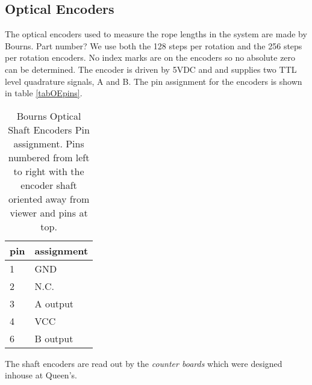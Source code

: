 \subsection{Optical Encoders}
The optical encoders used to measure the rope lengths in the system
are made by Bourns.  Part number?  We use both the 128 steps per
rotation and the 256 steps per rotation encoders.  No index marks are
on the encoders so no absolute zero can be determined.  The encoder
is driven by 5VDC and and supplies two TTL level quadrature signals,
A and B.  The pin assignment for the encoders is shown in 
table \ref{tabOEpins}.
\begin{table}[htb]
\begin{center}
\begin{tabular}{l|l}
pin & assignment\\
\hline
1 & GND\\
2 & N.C.\\
3 & A output \\
4 & VCC \\
6 & B output \\
\end{tabular}
\caption[Bourns Optical Shaft Encoders Pin assignment]
        {Bourns Optical Shaft Encoders Pin assignment.
         Pins numbered from left to right with the encoder
         shaft oriented away from viewer and pins at top.
        }
\end{center}
\end{table}
The shaft encoders are read out by the {\em counter boards} which
were designed inhouse at Queen's.  
   
  
\clearpage
\newpage
